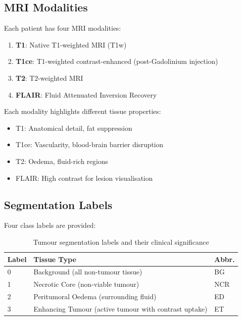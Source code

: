 \documentclass{ecsproject}     %
\begin{document}
\subsection{MRI Modalities}

Each patient has four MRI modalities:

\begin{enumerate}
    \item \textbf{T1}: Native T1-weighted MRI (T1w)
    \item \textbf{T1ce}: T1-weighted contrast-enhanced (post-Gadolinium injection)
    \item \textbf{T2}: T2-weighted MRI
    \item \textbf{FLAIR}: Fluid Attenuated Inversion Recovery
\end{enumerate}

Each modality highlights different tissue properties:
\begin{itemize}
    \item T1: Anatomical detail, fat suppression
    \item T1ce: Vascularity, blood-brain barrier disruption
    \item T2: Oedema, fluid-rich regions
    \item FLAIR: High contrast for lesion visualisation
\end{itemize}

\subsection{Segmentation Labels}

Four class labels are provided:

\begin{table}[h]
\centering
\begin{tabular}{|l|p{5cm}|p{3cm}|}
\hline
\textbf{Label} & \textbf{Tissue Type} & \textbf{Abbr.} \\
\hline
0 & Background (all non-tumour tissue) & BG \\
\hline
1 & Necrotic Core (non-viable tumour) & NCR \\
\hline
2 & Peritumoral Oedema (surrounding fluid) & ED \\
\hline
3 & Enhancing Tumour (active tumour with contrast uptake) & ET \\
\hline
\end{tabular}
\caption{Tumour segmentation labels and their clinical significance}
\label{Table:Labels}
\end{table}
\end{document}
